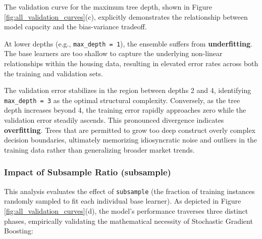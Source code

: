 \documentclass[11pt]{article}
\begin{document}
The validation curve for the maximum tree depth, shown in Figure \ref{fig:all_validation_curves}(c), explicitly demonstrates the relationship between model capacity and the bias-variance tradeoff. 

At lower depths (e.g., \texttt{max\_depth = 1}), the ensemble suffers from \textbf{underfitting}. The base learners are too shallow to capture the underlying non-linear relationships within the housing data, resulting in elevated error rates across both the training and validation sets. 

The validation error stabilizes in the region between depths 2 and 4, identifying \texttt{max\_depth = 3} as the optimal structural complexity. Conversely, as the tree depth increases beyond 4, the training error rapidly approaches zero while the validation error steadily ascends. This pronounced divergence indicates \textbf{overfitting}. Trees that are permitted to grow too deep construct overly complex decision boundaries, ultimately memorizing idiosyncratic noise and outliers in the training data rather than generalizing broader market trends.

\subsubsection{Impact of Subsample Ratio (subsample)}

This analysis evaluates the effect of \texttt{subsample} (the fraction of training instances randomly sampled to fit each individual base learner). As depicted in Figure \ref{fig:all_validation_curves}(d), the model's performance traverses three distinct phases, empirically validating the mathematical necessity of Stochastic Gradient Boosting:

\vspace{0.3cm} %
\end{document}
